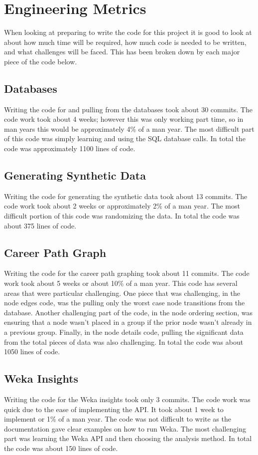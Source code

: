 \section{Engineering Metrics}
\label{sect:engineering-metrics}
When looking at preparing to write the code for this project it is good to look
at about how much time will be required, how much code is needed to be written,
and what challenges will be faced.  This has been broken down by each major
piece of the code below.
\subsection{Databases}
Writing the code for and pulling from the databases took about 30 commits.
The code work took about 4 weeks; however this was only working part time, so in
man years this would be approximately 4\% of a man year.  The most difficult
part of this code was simply learning and using the SQL database calls.  In
total the code was approximately 1100 lines of code.
\subsection{Generating Synthetic Data}
Writing the code for generating the synthetic data took about 13 commits.  The
code work took about 2 weeks or approximately 2\% of a man year.  The most difficult
portion of this code was randomizing the data.  In total the code was about 375
lines of code.
\subsection{Career Path Graph}
Writing the code for the career path graphing took about 11 commits.  The code
work took about 5 weeks or about 10\% of a man year.  This code has several
areas that were particular challenging.  One piece that was challenging, in the
node edges code, was the pulling only the worst case node transitions from
the database.  Another challenging part of the code, in the node ordering
section, was ensuring that a node wasn't placed in a group if the prior node
wasn't already in a previous group.  Finally, in the node details code, pulling
the significant data from the total pieces of data was also challenging.  In
total the code was about 1050 lines of code.
\subsection{Weka Insights}
Writing the code for the Weka insights took only 3 commits.  The code work was
quick due to the ease of implementing the API.  It took about 1 week to
implement or 1\% of a man year.  The code was not difficult to write as the
documentation gave clear examples on how to run Weka.  The most challenging part
was learning the Weka API and then choosing the analysis method.  In total the
code was about 150 lines of code.
